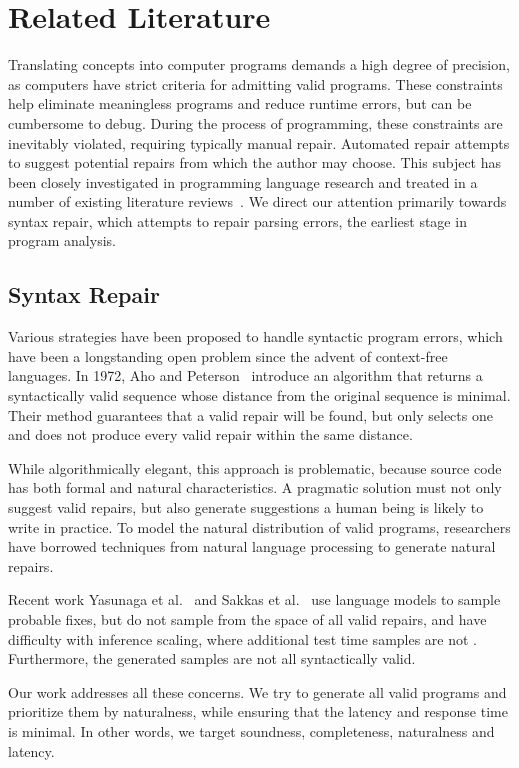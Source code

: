 \chapter{\rm\bfseries Related Literature}
\label{ch:litreview}

Translating concepts into computer programs demands a high degree of precision, as computers have strict criteria for admitting valid programs. These constraints help eliminate meaningless programs and reduce runtime errors, but can be cumbersome to debug. During the process of programming, these constraints are inevitably violated, requiring typically manual repair. Automated repair attempts to suggest potential repairs from which the author may choose. This subject has been closely investigated in programming language research and treated in a number of existing literature reviews~\cite{monperrus2018living, le2021automatic}. We direct our attention primarily towards syntax repair, which attempts to repair parsing errors, the earliest stage in program analysis.

\section{Syntax Repair}

Various strategies have been proposed to handle syntactic program errors, which have been a longstanding open problem since the advent of context-free languages. In 1972, Aho and Peterson~\cite{aho1972minimum} introduce an algorithm that returns a syntactically valid sequence whose distance from the original sequence is minimal. Their method guarantees that a valid repair will be found, but only selects one and does not produce every valid repair within the same distance.

While algorithmically elegant, this approach is problematic, because source code has both formal and natural characteristics. A pragmatic solution must not only suggest valid repairs, but also generate suggestions a human being is likely to write in practice. To model the natural distribution of valid programs, researchers have borrowed techniques from natural language processing to generate natural repairs.

Recent work Yasunaga et al.~\cite{yasunaga2021break} and Sakkas et al.~\cite{sakkas2022seq2parse} use language models to sample probable fixes, but do not sample from the space of all valid repairs, and have difficulty with inference scaling, where additional test time samples are not . Furthermore, the generated samples are not all syntactically valid.

Our work addresses all these concerns. We try to generate all valid programs and prioritize them by naturalness, while ensuring that the latency and response time is minimal. In other words, we target soundness, completeness, naturalness and latency.


\clearpage